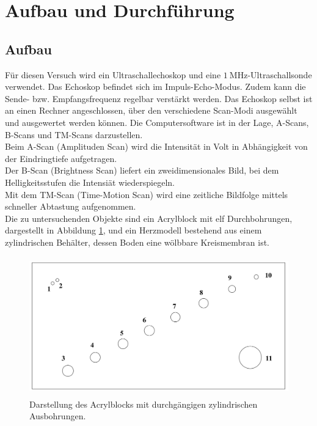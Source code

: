 \section{Aufbau und Durchführung}
\subsection{Aufbau}
\label{sec:Aufbau}

Für diesen Versuch wird ein Ultraschallechoskop und eine $\SI{1}{\mega\hertz}$-Ultraschallsonde verwendet.
Das Echoskop befindet sich im Impuls-Echo-Modus.
Zudem kann die Sende- bzw. Empfangsfrequenz regelbar verstärkt werden.
Das Echoskop selbst ist an einen Rechner angeschlossen, über den verschiedene Scan-Modi ausgewählt und ausgewertet werden können.
Die Computersoftware ist in der Lage, A-Scans, B-Scans und TM-Scans darzustellen.\\
Beim A-Scan (Amplituden Scan) wird die Intensität in Volt in Abhängigkeit von der Eindringtiefe aufgetragen.\\
Der B-Scan (Brightness Scan) liefert ein zweidimensionales Bild, bei dem Helligkeitsstufen die Intensiät wiederspiegeln.\\
Mit dem TM-Scan (Time-Motion Scan) wird eine zeitliche Bildfolge mittels schneller Abtastung aufgenommen.\\
Die zu untersuchenden Objekte sind ein Acrylblock mit elf Durchbohrungen, dargestellt in Abbildung \ref{abb:1}, und ein Herzmodell bestehend aus einem zylindrischen Behälter, dessen Boden eine wölbbare Kreismembran ist.
\begin{figure}[H]
  \centering
  \includegraphics[height=6cm]{ressources/aufbau.png}
  \caption{Darstellung des Acrylblocks mit durchgängigen zylindrischen Ausbohrungen. \cite{skript}}
  \label{abb:1}
\end{figure}
